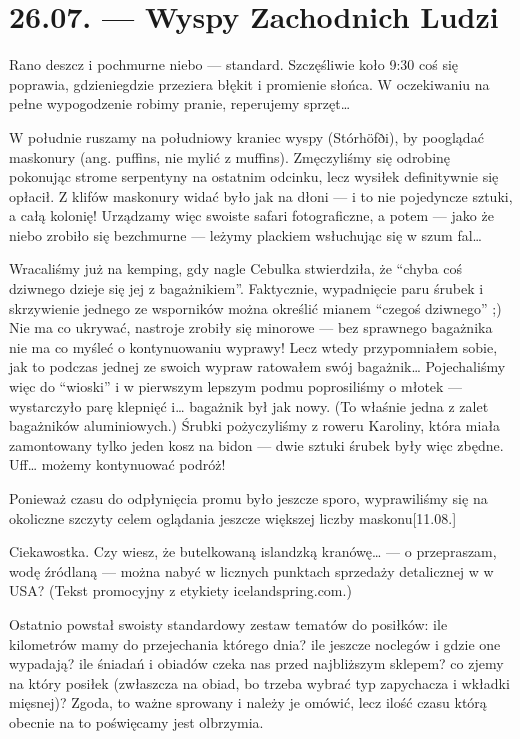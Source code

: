 \chapter*{26.07. --- Wyspy Zachodnich Ludzi}

Rano deszcz i pochmurne niebo --- standard. Szczęśliwie koło 9:30 coś się poprawia, gdzieniegdzie przeziera błękit i promienie słońca. W oczekiwaniu na pełne wypogodzenie robimy pranie, reperujemy sprzęt…


W południe ruszamy na południowy kraniec wyspy (Stórhöfði), by pooglądać maskonury (ang. puffins, nie mylić z muffins). Zmęczyliśmy się odrobinę pokonując strome serpentyny na ostatnim odcinku, lecz wysiłek definitywnie się opłacił. Z klifów maskonury widać było jak na dłoni --- i to nie pojedyncze sztuki, a całą kolonię! Urządzamy więc swoiste safari fotograficzne, a potem --- jako że niebo zrobiło się bezchmurne --- leżymy plackiem wsłuchując się w szum fal…

Wracaliśmy już na kemping, gdy nagle Cebulka stwierdziła, że “chyba coś dziwnego dzieje się jej z bagażnikiem”. Faktycznie, wypadnięcie paru śrubek i skrzywienie jednego ze wsporników można określić mianem “czegoś dziwnego” ;) Nie ma co ukrywać, nastroje zrobiły się minorowe --- bez sprawnego bagażnika nie ma co myśleć o kontynuowaniu wyprawy! Lecz wtedy przypomniałem sobie, jak to podczas jednej ze swoich wypraw ratowałem swój bagażnik… Pojechaliśmy więc do “wioski” i  w pierwszym lepszym podmu poprosiliśmy o młotek --- wystarczyło parę klepnięć i… bagażnik był jak nowy. (To właśnie jedna z zalet bagażników aluminiowych.) Śrubki pożyczyliśmy z roweru Karoliny, która miała zamontowany tylko jeden kosz na bidon --- dwie sztuki śrubek były więc zbędne. Uff… możemy kontynuować podróż!

Ponieważ czasu do odpłynięcia promu było jeszcze sporo, wyprawiliśmy się na okoliczne szczyty celem oglądania jeszcze większej liczby maskonu[11.08.]

Ciekawostka. Czy wiesz, że butelkowaną islandzką kranówę… --- o przepraszam, wodę źródlaną --- można nabyć w licznych punktach sprzedaży detalicznej w w USA? (Tekst promocyjny z etykiety icelandspring.com.)

Ostatnio powstał swoisty standardowy zestaw tematów do posiłków: ile kilometrów mamy do przejechania którego dnia? ile jeszcze noclegów i gdzie one wypadają? ile śniadań i obiadów czeka nas przed najbliższym sklepem? co zjemy na który posiłek (zwłaszcza na obiad, bo trzeba wybrać typ zapychacza i wkładki mięsnej)? Zgoda, to ważne sprowany i należy je omówić, lecz ilość czasu którą obecnie na to poświęcamy jest olbrzymia.

